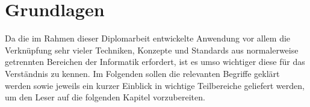 \chapter{Grundlagen}

Da die im Rahmen dieser Diplomarbeit entwickelte Anwendung vor allem die  Verknüpfung sehr vieler
Techniken, Konzepte und Standards aus normalerweise  getrennten Bereichen der Informatik erfordert,
ist es umso wichtiger diese für  das Verständnis zu kennen. Im Folgenden sollen die relevanten
Begriffe geklärt werden sowie jeweils ein kurzer Einblick in wichtige Teilbereiche geliefert werden,
um den Leser auf die folgenden Kapitel vorzubereiten.



\clearpage



\clearpage


